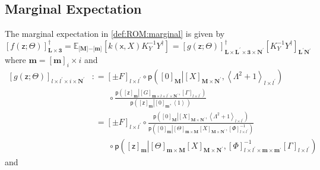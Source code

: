 \documentclass[preprint,12pt]{elsarticle}
\newcommand*{\M}[1]{\ensuremath{#1}\xspace}
\newcommand*{\x}{\times}
\newcommand*{\mi}[1]{\mathbf{#1}}
\newcommand*{\rv}[1]{\mathsf{#1}}
\newcommand*{\te}[2][]{\left\lbrack{#2}\right\rbrack_{#1}}
\newcommand*{\tse}[2][]{\mi{\lbrack#2\rbrack}_{#1}}
\newcommand*{\diag}[2][]{\left\langle{#2}\right\rangle_{#1}}
\newcommand*{\prob}[3]{\M{\mathsf{p}\!\left(\left.{#1}\right\vert{#2,#3}\right)}}
\newcommand*{\deq}{\M{\mathrel{\mathop:}=}}
\newcommand*{\evt}[3][]{\mathbb{E}_{#3}^{#1}\!#2}
\begin{document}
        \subsection{Marginal Expectation} \label{sub:ROM:Expectation}
            The marginal expectation in \cref{def:ROM:marginal} is given by
            \begin{equation*}
                \te[\mi{L\x 3}]{f({\rv{z}}; \Theta)}^{\dagger}
                = \evt{\te{k(\rv{x},X) K_{Y}^{-1} Y^{\dagger}}}{\tse{M}\mi{-}\tse{m}}
                = \te[\mi{L}\x\mi{L^{\prime}}\x \mi{3} \x\mi{N^{\prime}}]{g({\rv{z}}; \Theta)}^{\dagger}
                \te[\mi{L^{\prime}N^{\prime}}]{K_{Y}^{-1} Y^{\dagger}}
            \end{equation*}
            where $\mi{m} = \te[i]{\mi{m}}\x i$ and
            \begin{equation*}
                \begin{aligned}
                    \te[l\x l^{\prime}\x i \x\mi{N^{\prime}}]{g({\rv{z}}; \Theta)} 
                    &\deq \te[l\x l^{\prime}]{\pm F} \circ 
                    \prob{\te[\mi{M}]{0}}{\te[\mi{M}\x\mi{N^{\prime}}]{X}}
                    {\diag[l\x l^{\prime}]{\Lambda^{2}+1}} \\
                    & \phantom{\deq\ } \circ \frac
                    {\prob{\te[\mi{m}]{\rv{z}}}{\te[\mi{m}\x l\x l^{\prime}\x\mi{N^{\prime}}]{G}}{\te[l\x l^{\prime}]{\Gamma}}}
                    {\prob{\te[\mi{m}]{\rv{z}}}{\te[\mi{m}]{0}}{\diag[]{1}}} \\
                    &\phantom{:}= \te[l\x l^{\prime}]{\pm F} \circ 
                    \frac
                    {\prob{\te[\mi{M}]{0}}{\te[\mi{M}\x\mi{N^{\prime}}]{X}}
                    {\diag[l\x l^{\prime}]{\Lambda^{2}+1}}} 
                    {\prob{\te[\mi{m}]{0}}{\te[\mi{m}\x\mi{M}]{\Theta}\te[\mi{M}\x\mi{N^{\prime}}]{X}}
                    {\te[l\x l^{\prime}]{\Phi}^{-1}}} \\
                    & \phantom{\deq\ } \circ
                    {\prob{\te[\mi{m}]{\rv{z}}}{\te[\mi{m}\x\mi{M}]{\Theta}\te[\mi{M}\x\mi{N^{\prime}}]{X}}
                    {\te[l\x l^{\prime}\x\mi{m}\x\mi{m^{\prime}}]{\Phi}^{-1}\te[l\x l^{\prime}]{\Gamma}}}
                \end{aligned}                    
            \end{equation*}
            and
\end{document}
